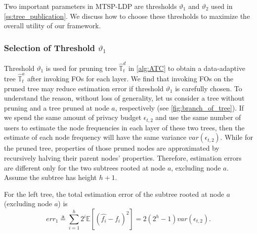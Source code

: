 \documentclass[acmsmall]{acmart}
\newcommand{\E}{\mathbb{E}}
\newcommand{\Tree}{\mathbb{T}}
\newcommand{\hDT}{\hat{\Tree}^d}
\newcommand{\hAT}{\hat{\Tree}^a}
\newcommand{\err}{\mathit{err}}
\newcommand{\var}{\mathit{var}}
\begin{document}
Two important parameters in MTSP-LDP are thresholds $\vartheta_1$ and $\vartheta_2$
used in \cref{ss:tree_publication}.
We discuss how to choose these thresholds to maximize the overall utility of our
framework.


\subsubsection{Selection of Threshold $\vartheta_1$}
Threshold $\vartheta_1$ is used for pruning tree $\hDT_t$ in \cref{alg:ATC} to
obtain a data-adaptive tree $\hAT_t$ after invoking FOs for each layer.
We find that invoking FOs on the pruned tree may reduce estimation error if
threshold $\vartheta_1$ is carefully chosen.
To understand the reason, without loss of generality, let us consider a tree
without pruning and a tree pruned at node $a$, respectively (see
\cref{fig:branch_of_tree}).
If we spend the same amount of privacy budget $\epsilon_{t,2}$ and use the same
number of users to estimate the node frequencies in each layer of these two
trees, then the estimate of each node frequency will have the same variance
$\var(\epsilon_{t,2})$.
While for the pruned tree, properties of those pruned nodes are approximated by
recursively halving their parent nodes' properties.
Therefore, estimation errors are different only for the two subtrees rooted at
node $a$, excluding node $a$.
Assume the subtree has height $h+1$.

For the left tree, the total estimation error of the subtree rooted at node $a$
(excluding node $a$) is
\[
  \err_1 \triangleq
  \sum_{i=1}^h 2^i\E[(\hat{f_i} - f_i)^2]
  = 2(2^h-1)\var(\epsilon_{t,2}).
\]
\end{document}
